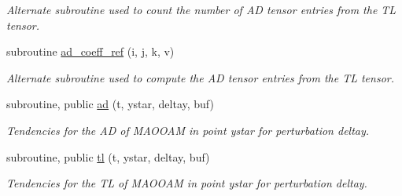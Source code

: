 \begin{DoxyCompactItemize}
\begin{DoxyCompactList}\small\item\em Alternate subroutine used to count the number of AD tensor entries from the TL tensor. \end{DoxyCompactList}\item 
subroutine \hyperlink{namespacetl__ad__tensor_aef0157a16688323e3c855ef451d6948f}{ad\+\_\+coeff\+\_\+ref} (i, j, k, v)
\begin{DoxyCompactList}\small\item\em Alternate subroutine used to compute the AD tensor entries from the TL tensor. \end{DoxyCompactList}\item 
subroutine, public \hyperlink{namespacetl__ad__tensor_af4683da4f4149b809eb66c3223266ffd}{ad} (t, ystar, deltay, buf)
\begin{DoxyCompactList}\small\item\em Tendencies for the AD of M\+A\+O\+O\+AM in point ystar for perturbation deltay. \end{DoxyCompactList}\item 
subroutine, public \hyperlink{namespacetl__ad__tensor_a2a6bcaa9d4e82c35f6bfb2fdb9016dd9}{tl} (t, ystar, deltay, buf)
\begin{DoxyCompactList}\small\item\em Tendencies for the TL of M\+A\+O\+O\+AM in point ystar for perturbation deltay. \end{DoxyCompactList}\end{DoxyCompactItemize}
